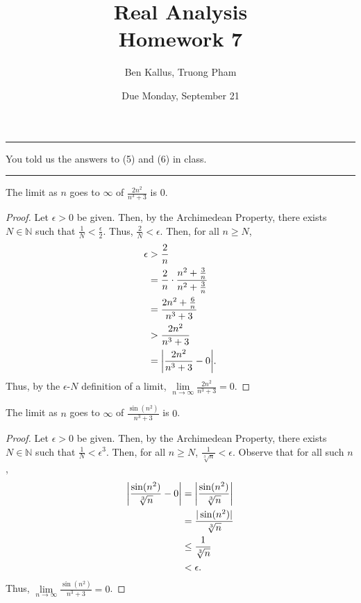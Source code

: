 \documentclass[12pt]{article}
\title{Real Analysis \\ Homework 7}
\author{Ben Kallus, Truong Pham}
\date{Due Monday, September 21}
\begin{document}
\maketitle

\hrule
\bigskip

 You told us the answers to (5) and (6) in class.

\bigskip
\hrule
\bigskip

 The limit as $n$ goes to $\infty$ of $\frac{2n^2}{n^3+3}$ is $0$.
\begin{proof}
    Let $\epsilon > 0$ be given. Then, by the Archimedean Property, there exists $N \in \mathbb N$ such that $\frac1N < \frac\epsilon2$. Thus, $\frac2N < \epsilon$. Then, for all $n \geq N$,
    \begin{align*}
        \epsilon &> \frac2n \\
                 &= \frac2n \cdot \frac{n^2+\frac3n}{n^2+\frac3n} \\
                 &= \frac{2n^2+\frac6n}{n^3+3} \\
                 &> \frac{2n^2}{n^3+3} \\
                 &= \bigg{|} \frac{2n^2}{n^3+3} - 0 \bigg{|}.
    \end{align*}
    Thus, by the $\epsilon$-$N$ definition of a limit, $\lim\limits_{n\to\infty}\frac{2n^2}{n^3+3} = 0$.
\end{proof}

\newpage
{} The limit as $n$ goes to $\infty$ of $\frac{\sin(n^2)}{n^3+3}$ is $0$.
\begin{proof}
    Let $\epsilon > 0$ be given. Then, by the Archimedean Property, there exists $N \in \mathbb N$ such that $\frac1N < \epsilon^3$. Then, for all $n \geq N$, $\frac1{\sqrt[3]n} < \epsilon$. Observe that for all such $n$,
    \begin{align*}
        \bigg{|} \frac{\sin(n^2)}{\sqrt[3]n} - 0\bigg{|} &= \bigg{|} \frac{\sin(n^2)}{\sqrt[3]n} \bigg{|} \\
        &= \frac{|\sin(n^2)|}{\sqrt[3]n} \\
        &\leq \frac1{\sqrt[3] n} \\
        &< \epsilon.
    \end{align*}
    Thus, $\lim\limits_{n\to\infty}\frac{\sin(n^2)}{n^3+3} = 0$.
\end{proof}
\end{document}
